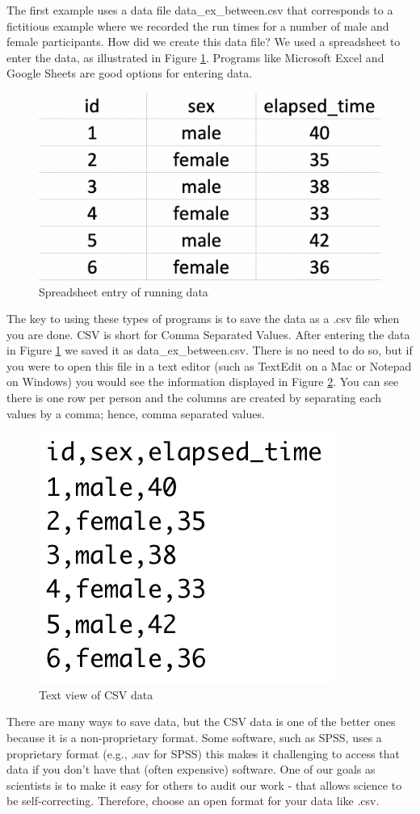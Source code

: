 \documentclass[
]{krantz}
\begin{document}
The first example uses a data file data\_ex\_between.csv that corresponds to a fictitious example where we recorded the run times for a number of male and female participants. How did we create this data file? We used a spreadsheet to enter the data, as illustrated in Figure \ref{fig:spreadsheetbetween}. Programs like Microsoft Excel and Google Sheets are good options for entering data.

\begin{figure}
\includegraphics[width=0.4\linewidth]{ch_enter_load/images/screenshot_data_between} \caption{Spreadsheet entry of running data}\label{fig:spreadsheetbetween}
\end{figure}

The key to using these types of programs is to save the data as a .csv file when you are done. CSV is short for Comma Separated Values. After entering the data in Figure \ref{fig:spreadsheetbetween} we saved it as data\_ex\_between.csv. There is no need to do so, but if you were to open this file in a text editor (such as TextEdit on a Mac or Notepad on Windows) you would see the information displayed in Figure \ref{fig:csvsheetbetween}. You can see there is one row per person and the columns are created by separating each values by a comma; hence, comma separated values.

\begin{figure}
\includegraphics[width=0.25\linewidth]{ch_enter_load/images/screenshot_csv_between} \caption{Text view of CSV data}\label{fig:csvsheetbetween}
\end{figure}

There are many ways to save data, but the CSV data is one of the better ones because it is a non-proprietary format. Some software, such as SPSS, uses a proprietary format (e.g., .sav for SPSS) this makes it challenging to access that data if you don't have that (often expensive) software. One of our goals as scientists is to make it easy for others to audit our work - that allows science to be self-correcting. Therefore, choose an open format for your data like .csv.
\end{document}

